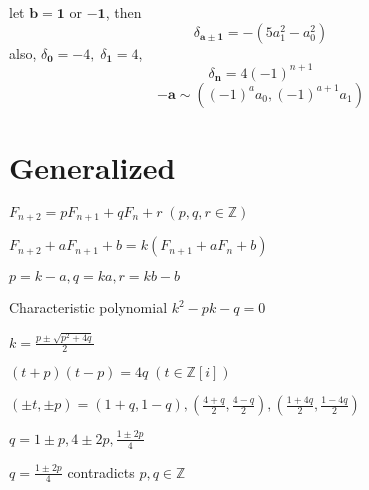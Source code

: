 \documentclass[12pt,letterpaper]{article}
\begin{document}
\begin{flushleft}
let $\mathbf{b} = \mathbf{1}$ or $\mathbf{-1}$, then
\[\delta_\mathbf{a\pm 1}=-\left(5a_1^2-a_0^2\right)\]
also, $\delta_\mathbf{0}=-4,\; \delta_\mathbf{1}=4$,
\[\delta_\mathbf{n} = 4(-1)^{n+1}\]
\[\mathbf{-a} \sim \left(\left(-1\right)^a a_0, \left(-1\right)^{a+1} a_1\right)\]

\section{Generalized}

$F_{n+2} = p F_{n+1} + q F_n + r \; (p, q, r \in \mathbb{Z})$

$F_{n+2} + a F_{n+1} + b = k\left(F_{n+1} + a F_n + b\right)$

$p=k-a, q=ka, r=kb-b$

Characteristic polynomial $k^2-pk-q=0$

$\displaystyle k=\frac{p\pm\sqrt{p^2+4q}}{2}$

$(t+p)(t-p)=4q\;(t \in \mathbb{Z}[i])$

$\displaystyle (\pm t,\pm p) = \left(1+q, 1-q\right), \left(\frac{4+q}{2}, \frac{4-q}{2}\right), \left(\frac{1+4q}{2},\frac{1-4q}{2} \right)$

$\displaystyle q = 1 \pm p, 4 \pm 2p, \frac{1 \pm 2p}{4}$

$\displaystyle q = \frac{1 \pm 2p}{4}$ contradicts $p, q \in \mathbb{Z}$

\end{flushleft}
\end{document}
